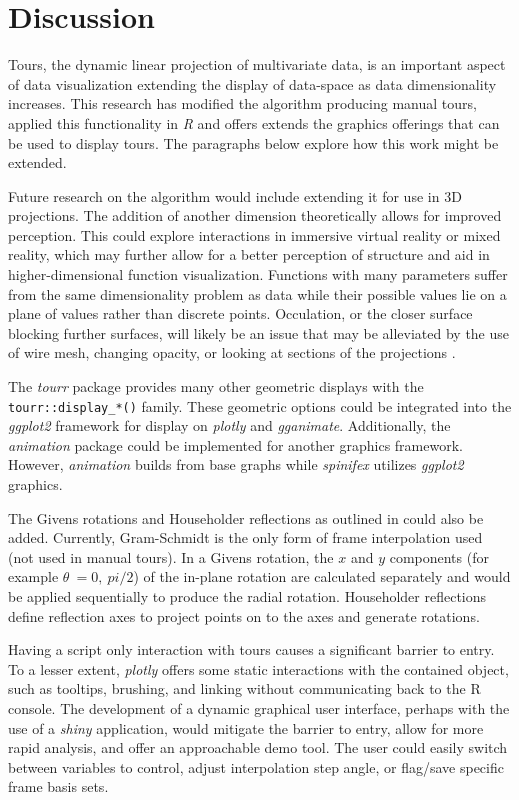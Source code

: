 \documentclass{monashthesis}
\theoremstyle{definition}
\theoremstyle{definition}
\theoremstyle{definition}
\theoremstyle{remark}
\begin{document}
\section{Discussion}\label{sec:discussion}

Tours, the dynamic linear projection of multivariate data, is an
important aspect of data visualization extending the display of
data-space as data dimensionality increases. This research has modified
the algorithm producing manual tours, applied this functionality in
\emph{R} and offers extends the graphics offerings that can be used to
display tours. The paragraphs below explore how this work might be
extended.

Future research on the algorithm would include extending it for use in
3D projections. The addition of another dimension theoretically allows
for improved perception. This could explore interactions in immersive
virtual reality or mixed reality, which may further allow for a better
perception of structure and aid in higher-dimensional function
visualization. Functions with many parameters suffer from the same
dimensionality problem as data while their possible values lie on a
plane of values rather than discrete points. Occulation, or the closer
surface blocking further surfaces, will likely be an issue that may be
alleviated by the use of wire mesh, changing opacity, or looking at
sections of the projections \autocite{furnas_prosection_1994}.

The \emph{tourr} package provides many other geometric displays with the
\texttt{tourr::display\_*()} family. These geometric options could be
integrated into the \emph{ggplot2} framework for display on
\emph{plotly} and \emph{gganimate}. Additionally, the \emph{animation}
package \textcite{xie_animation:_2018} could be implemented for another
graphics framework. However, \emph{animation} builds from base graphs
while \emph{spinifex} utilizes \emph{ggplot2} graphics.

The Givens rotations and Householder reflections as outlined in
\textcite{buja_computational_2005} could also be added. Currently,
Gram-Schmidt is the only form of frame interpolation used (not used in
manual tours). In a Givens rotation, the \(x\) and \(y\) components (for
example \(\theta~= 0,~pi/2\)) of the in-plane rotation are calculated
separately and would be applied sequentially to produce the radial
rotation. Householder reflections define reflection axes to project
points on to the axes and generate rotations.

Having a script only interaction with tours causes a significant barrier
to entry. To a lesser extent, \emph{plotly} offers some static
interactions with the contained object, such as tooltips, brushing, and
linking without communicating back to the R console. The development of
a dynamic graphical user interface, perhaps with the use of a
\emph{shiny} \autocite{chang_shiny:_2018} application, would mitigate
the barrier to entry, allow for more rapid analysis, and offer an
approachable demo tool. The user could easily switch between variables
to control, adjust interpolation step angle, or flag/save specific frame
basis sets.

\printbibliography[heading=bibintoc]
\end{document}
